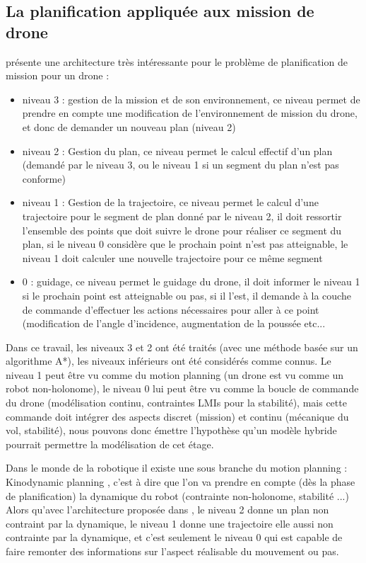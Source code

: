 \subsection{La planification appliquée aux mission de drone}
\cite{chanthery_planification_2005} présente une architecture très intéressante pour le problème de planification de mission pour un drone : 
\begin{itemize}
	\item niveau 3 : gestion de la mission et de son environnement, ce niveau permet de prendre en compte une modification de l'environnement de mission du drone, et donc de demander un nouveau plan (niveau 2)
	\item niveau 2 : Gestion du plan, ce niveau permet le calcul effectif d'un plan (demandé par le niveau 3, ou le niveau 1 si un segment du plan n'est pas conforme)
	\item niveau 1 : Gestion de la trajectoire, ce niveau permet le calcul d'une trajectoire pour le segment de plan donné par le niveau 2, il doit ressortir l'ensemble des points que doit suivre le drone pour réaliser ce segment du plan, si le niveau 0 considère que le prochain point n'est pas atteignable, le niveau 1 doit calculer une nouvelle trajectoire pour ce même segment
	\item 0 : guidage, ce niveau permet le guidage du drone, il doit informer le niveau 1 si le prochain point est atteignable ou pas, si il l'est, il demande à la couche de commande d'effectuer les actions nécessaires pour aller à ce point (modification de l'angle d'incidence, augmentation de la poussée etc...
\end{itemize}
Dans ce travail, les niveaux 3 et 2 ont été traités (avec une méthode basée sur un algorithme A*), les niveaux inférieurs ont été considérés comme connus. Le niveau 1 peut être vu comme du motion planning (un drone est vu comme un robot non-holonome), le niveau 0 lui peut être vu comme la boucle de commande du drone (modélisation continu, contraintes LMIs pour la stabilité), mais cette commande doit intégrer des aspects discret (mission) et continu (mécanique du vol, stabilité), nous pouvons donc émettre l'hypothèse qu'un modèle hybride pourrait permettre la modélisation de cet étage.

Dans le monde de la robotique il existe une sous branche du motion planning : Kinodynamic planning \cite{masoud_kinodynamic_2010}, c'est à dire que l'on va prendre en compte (dès la phase de planification) la dynamique du robot (contrainte non-holonome, stabilité ...)
Alors qu'avec l'architecture proposée dans \cite{chanthery_planification_2005}, le niveau 2 donne un plan non contraint par la dynamique, le niveau 1 donne une trajectoire elle aussi non contrainte par la dynamique, et c'est seulement le niveau 0 qui est capable de faire remonter des informations sur l'aspect réalisable du mouvement ou pas.

